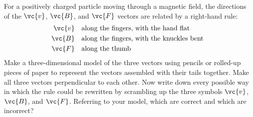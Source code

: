 For a positively charged particle moving through a magnetic field,
        the directions of the $\vc{v}$, $\vc{B}$, and $\vc{F}$ vectors
        are related by a right-hand rule:
        \begin{align*}
                \vc{v}        & \quad \text{along the fingers, with the hand flat}\\
                \vc{B}        & \quad \text{along the fingers, with the knuckles bent}\\
                \vc{F}        & \quad \text{along the thumb}
        \end{align*}
        Make a three-dimensional model of the three vectors using
        pencils or rolled-up pieces of paper to represent the
        vectors assembled with their tails together. Make all three vectors
        perpendicular to each other. Now write down
        every possible way in which the rule could be rewritten by
        scrambling up the three symbols $\vc{v}$, $\vc{B}$, and $\vc{F}$. Referring
        to your model, which are correct and which are incorrect?
